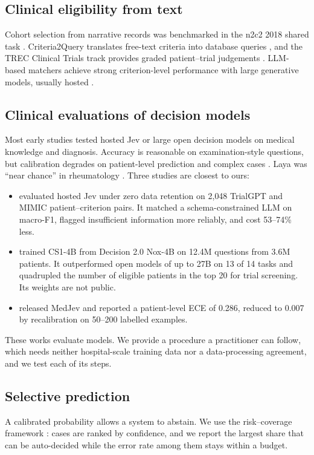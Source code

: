 \documentclass[11pt]{article}
\begin{document}
\subsection{Clinical eligibility from text}
Cohort selection from narrative records was benchmarked in the n2c2 2018 shared task \citep{stubbs2019n2c2}.
Criteria2Query translates free-text criteria into database queries \citep{yuan2019criteria2query}, and the TREC Clinical Trials track provides graded patient--trial judgements \citep{roberts2021trec}.
LLM-based matchers achieve strong criterion-level performance with large generative models, usually hosted \citep{jin2024trialgpt,wornow2024zeroshot}.

\subsection{Clinical evaluations of decision models}
Most early studies tested hosted Jev or large open decision models on medical knowledge and diagnosis.
Accuracy is reasonable on examination-style questions, but calibration degrades on patient-level prediction and complex cases \citep{du2026reliable,madrid2026rheum,you2026triage,deobhakta2026ddx}. Laya was ``near chance'' in rheumatology \citep{madrid2026rheum}.
Three studies are closest to ours:
\begin{itemize}[nosep]
\item \citet{he2026trial} evaluated hosted Jev under zero data retention on 2{,}048 TrialGPT and MIMIC patient--criterion pairs. It matched a schema-constrained LLM on macro-F1, flagged insufficient information more reliably, and cost 53--74\% less.
\item \citet{zhang2026cs1} trained CS1-4B from Decision 2.0 Nox-4B on 12.4M questions from 3.6M patients. It outperformed open models of up to 27B on 13 of 14 tasks and quadrupled the number of eligible patients in the top 20 for trial screening. Its weights are not public.
\item \citet{lee2026medjev} released MedJev and reported a patient-level ECE of 0.286, reduced to 0.007 by recalibration on 50--200 labelled examples.
\end{itemize}
These works evaluate models. We provide a procedure a practitioner can follow, which needs neither hospital-scale training data nor a data-processing agreement, and we test each of its steps.

\subsection{Selective prediction}
A calibrated probability allows a system to abstain.
We use the risk--coverage framework \citep{geifman2017selective}: cases are ranked by confidence, and we report the largest share that can be auto-decided while the error rate among them stays within a budget.
\end{document}
